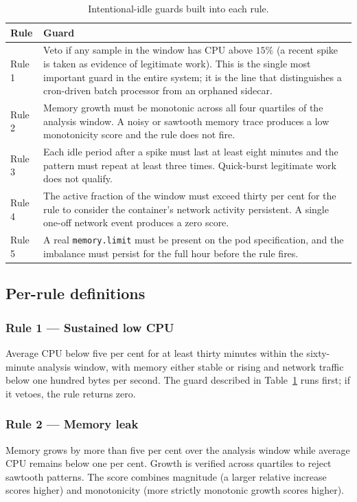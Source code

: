 \documentclass[11pt,a4paper,oneside]{article}
\begin{document}
\begin{table}[H]
\centering
\caption{Intentional-idle guards built into each rule.}
\label{tab:guards}
\begin{tabularx}{\textwidth}{lX}
\toprule
\textbf{Rule} & \textbf{Guard} \\
\midrule
Rule 1 & Veto if any sample in the window has CPU above \(15\%\)
        (a recent spike is taken as evidence of legitimate work). This is
        the single most important guard in the entire system; it is the
        line that distinguishes a cron-driven batch processor from an
        orphaned sidecar. \\
Rule 2 & Memory growth must be monotonic across all four quartiles of the
        analysis window. A noisy or sawtooth memory trace produces a low
        monotonicity score and the rule does not fire. \\
Rule 3 & Each idle period after a spike must last at least eight minutes
        and the pattern must repeat at least three times. Quick-burst
        legitimate work does not qualify. \\
Rule 4 & The active fraction of the window must exceed thirty per cent
        for the rule to consider the container's network activity
        persistent. A single one-off network event produces a zero score. \\
Rule 5 & A real \texttt{memory.limit} must be present on the pod
        specification, and the imbalance must persist for the full hour
        before the rule fires. \\
\bottomrule
\end{tabularx}
\end{table}

\subsection{Per-rule definitions}

\subsubsection*{Rule 1 --- Sustained low CPU}
Average CPU below five per cent for at least thirty minutes within the
sixty-minute analysis window, with memory either stable or rising and
network traffic below one hundred bytes per second. The guard described
in Table~\ref{tab:guards} runs first; if it vetoes, the rule returns zero.

\subsubsection*{Rule 2 --- Memory leak}
Memory grows by more than five per cent over the analysis window while
average CPU remains below one per cent. Growth is verified across
quartiles to reject sawtooth patterns. The score combines magnitude (a
larger relative increase scores higher) and monotonicity (more strictly
monotonic growth scores higher).
\end{document}
